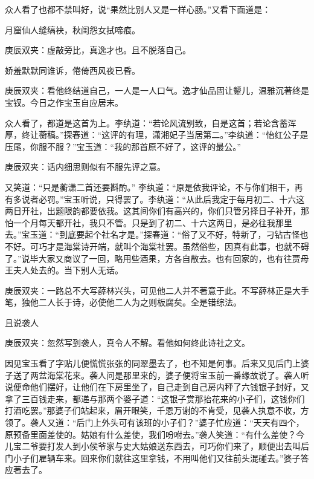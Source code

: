 \begin{parag}
    众人看了也都不禁叫好，说“果然比别人又是一样心肠。”又看下面道是：
\end{parag}


\begin{poem}
    \begin{pl}月窟仙人缝缟袂，秋闺怨女拭啼痕。\end{pl}\begin{note}庚辰双夹：虚敲旁比，真逸才也。且不脱落自己。\end{note}

    \begin{pl}娇羞默默同谁诉，倦倚西风夜已昏。\end{pl}\begin{note}庚辰双夹：看他终结道自己，一人是一人口气。逸才仙品固让颦儿，温雅沉著终是宝钗。今日之作宝玉自应居末。\end{note}
\end{poem}


\begin{parag}
    众人看了，都道是这首为上。李纨道：“若论风流别致，自是这首；若论含蓄浑厚，终让蘅稿。”探春道：“这评的有理，潇湘妃子当居第二。”李纨道：“怡红公子是压尾，你服不服？”宝玉道：“我的那首原不好了，这评的最公。”\begin{note}庚辰双夹：话内细思则似有不服先评之意。\end{note}又笑道：“只是蘅潇二首还要斟酌。” 李纨道：“原是依我评论，不与你们相干，再有多说者必罚。”宝玉听说，只得罢了。李纨道：“从此后我定于每月初二、十六这两日开社，出题限韵都要依我。这其间你们有高兴的，你们只管另择日子补开，那怕一个月每天都开社，我只不管。只是到了初二、十六这两日，是必往我那里去。”宝玉道：“到底要起个社名才是。”探春道：“俗了又不好，特新了，刁钻古怪也不好。可巧才是海棠诗开端，就叫个海棠社罢。虽然俗些，因真有此事，也就不碍了。”说毕大家又商议了一回，略用些酒果，方各自散去。也有回家的，也有往贾母王夫人处去的。当下别人无话。\begin{note}庚辰双夹：一路总不大写薛林兴头，可见他二人并不著意于此。不写薛林正是大手笔，独他二人长于诗，必使他二人为之则板腐矣。全是错综法。\end{note}
\end{parag}


\begin{parag}
    且说袭人\begin{note}庚辰双夹：忽然写到袭人，真令人不解。看他如何终此诗社之文。\end{note}因见宝玉看了字贴儿便慌慌张张的同翠墨去了，也不知是何事。后来又见后门上婆子送了两盆海棠花来。袭人问是那里来的，婆子便将宝玉前一番缘故说了。袭人听说便命他们摆好，让他们在下房里坐了，自己走到自己房内秤了六钱银子封好，又拿了三百钱走来，都递与那两个婆子道：“这银子赏那抬花来的小子们，这钱你们打酒吃罢。”那婆子们站起来，眉开眼笑，千恩万谢的不肯受，见袭人执意不收，方领了。袭人又道：“后门上外头可有该班的小子们？”婆子忙应道：“天天有四个，原预备里面差使的。姑娘有什么差使，我们吩咐去。”袭人笑道：“有什么差使？今儿宝二爷要打发人到小侯爷家与史大姑娘送东西去，可巧你们来了，顺便出去叫后门小子们雇辆车来。回来你们就往这里拿钱，不用叫他们又往前头混碰去。”婆子答应著去了。
\end{parag}


